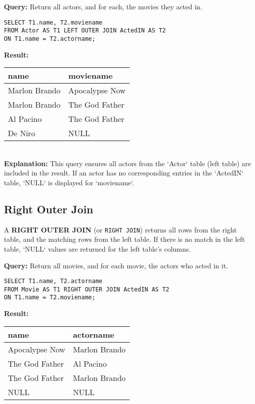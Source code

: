 \documentclass{article}
\begin{document}
\textbf{Query:} Return all actors, and for each, the movies they acted in. 
\begin{lstlisting}
SELECT T1.name, T2.moviename
FROM Actor AS T1 LEFT OUTER JOIN ActedIN AS T2
ON T1.name = T2.actorname;
\end{lstlisting}

\textbf{Result:}\\ 
\begin{tabular}{|l|l|}
    \hline
    \textbf{name} & \textbf{moviename} \\
    \hline
    Marlon Brando & Apocalypse Now \\
    Marlon Brando & The God Father \\
    Al Pacino & The God Father \\
    De Niro & NULL \\
    \hline
\end{tabular}\\

\textbf{Explanation:} This query ensures all actors from the `Actor` table (left table) are included in the result. If an actor has no corresponding entries in the `ActedIN` table, `NULL` is displayed for `moviename`.

\subsection*{Right Outer Join}
A \textbf{RIGHT OUTER JOIN} (or \texttt{RIGHT JOIN}) returns all rows from the right table, and the matching rows from the left table. If there is no match in the left table, `NULL` values are returned for the left table's columns.

\textbf{Query:} Return all movies, and for each movie, the actors who acted in it. 
\begin{lstlisting}
SELECT T1.name, T2.actorname
FROM Movie AS T1 RIGHT OUTER JOIN ActedIN AS T2
ON T1.name = T2.moviename;
\end{lstlisting}

\textbf{Result:} \\
\begin{tabular}{|l|l|}
    \hline
    \textbf{name} & \textbf{actorname} \\
    \hline
    Apocalypse Now & Marlon Brando \\
    The God Father & Al Pacino \\
    The God Father & Marlon Brando \\
    NULL & NULL \\ %
    \hline
\end{tabular}
\end{document}
